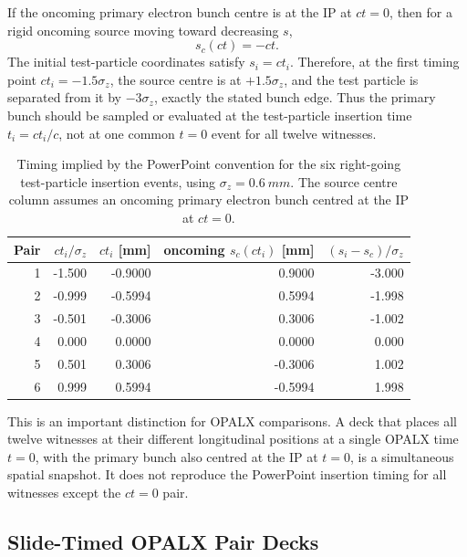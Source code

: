 \documentclass[11pt]{article}
\begin{document}
If the oncoming primary electron bunch centre is at the IP at \(ct=0\), then
for a rigid oncoming source moving toward decreasing \(s\),
\[
  s_c(ct) = -ct .
\]
The initial test-particle coordinates satisfy \(s_i=ct_i\).  Therefore, at the
first timing point \(ct_i=-1.5\sigma_z\), the source centre is at
\(+1.5\sigma_z\), and the test particle is separated from it by
\(-3\sigma_z\), exactly the stated bunch edge.  Thus the primary bunch should
be sampled or evaluated at the test-particle insertion time \(t_i=ct_i/c\), not
at one common \(t=0\) event for all twelve witnesses.

\begin{table}[htbp]
  \centering
  \begin{tabular}{rrrrr}
    \hline
    Pair & \(ct_i/\sigma_z\) & \(ct_i\) [\si{mm}]
    & oncoming \(s_c(ct_i)\) [\si{mm}]
    & \((s_i-s_c)/\sigma_z\) \\
    \hline
    1 & -1.500 & -0.9000 &  0.9000 & -3.000 \\
    2 & -0.999 & -0.5994 &  0.5994 & -1.998 \\
    3 & -0.501 & -0.3006 &  0.3006 & -1.002 \\
    4 &  0.000 &  0.0000 &  0.0000 &  0.000 \\
    5 &  0.501 &  0.3006 & -0.3006 &  1.002 \\
    6 &  0.999 &  0.5994 & -0.5994 &  1.998 \\
    \hline
  \end{tabular}
  \caption{Timing implied by the PowerPoint convention for the six
  right-going test-particle insertion events, using
  \(\sigma_z=\SI{0.6}{mm}\).  The source centre column assumes an oncoming
  primary electron bunch centred at the IP at \(ct=0\).}
  \label{tab:pptx-timing-convention}
\end{table}

This is an important distinction for OPALX comparisons.  A deck that places all
twelve witnesses at their different longitudinal positions at a single OPALX
time \(t=0\), with the primary bunch also centred at the IP at \(t=0\), is a
simultaneous spatial snapshot.  It does not reproduce the PowerPoint insertion
timing for all witnesses except the \(ct=0\) pair.

\subsection{Slide-Timed OPALX Pair Decks}
\end{document}
